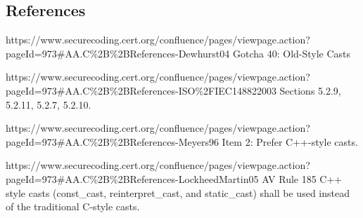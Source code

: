 \subsection{References}


{https://www.securecoding.cert.org/confluence/pages/viewpage.action?pageId=973\#AA.C\%2B\%2BReferences-Dewhurst04}
Gotcha 40: Old-Style Casts

{https://www.securecoding.cert.org/confluence/pages/viewpage.action?pageId=973\#AA.C\%2B\%2BReferences-ISO\%2FIEC148822003}
Sections 5.2.9, 5.2.11, 5.2.7, 5.2.10.

{https://www.securecoding.cert.org/confluence/pages/viewpage.action?pageId=973\#AA.C\%2B\%2BReferences-Meyers96}
Item 2: Prefer C++-style casts.

{https://www.securecoding.cert.org/confluence/pages/viewpage.action?pageId=973\#AA.C\%2B\%2BReferences-LockheedMartin05}
AV Rule 185 C++ style casts (const\_cast, reinterpret\_cast, and static\_cast)
shall be used instead of the traditional C-style casts.
